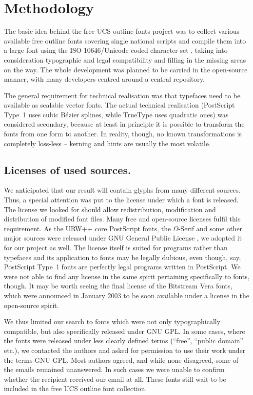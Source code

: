 \documentclass[english]{eurotex2003}
\begin{document}
\section{Methodology}

The basic idea behind the free UCS outline fonts project was to
collect various available free outline fonts covering single national
scripts and compile them into a large font using the ISO 10646/Unicode
coded character set \cite{Unicode3}, taking into consideration
typographic and legal compatibility and filling in the missing areas
on the way. The whole development was planned to be carried in the
open-source manner, with many developers centred around a central
repository.

The general requirement for technical realisation was that typefaces
need to be available as scalable vector fonts. The actual technical
realisation (Post\-Script Type~1 \cite{Adobe:Type1} uses cubic B\'ezier
splines, while TrueType \cite{Apple:TrueType} uses quadratic ones) was
considered secondary, because at least in principle it is possible
to transform the fonts from one form to another. In reality, though,
no known transformations is completely loss-less -- kerning and hints
are usually the most volatile.

\subsection{Licenses of used sources.} We anticipated that our result
will contain glyphs from many different sources. Thus, a special
attention was put to the license under which a font is released. The
license we looked for should allow redistribution, modification and
distribution of modified font files. Many free and open-source
licenses fulfil this requirement. As the URW++ core PostScript fonts,
the $\Omega$-Serif and some other major sources were released under
GNU General Public License \cite{GNU:GPL}, we adopted it for our
project as well. The license itself is suited for programs rather than
typefaces and its application to fonts may be legally dubious, even
though, say, PostScript Type~1 fonts are perfectly legal programs
written in PostScript. We were not able to find any license in the
same spirit pertaining specifically to fonts, though. It may be worth
seeing the final license of the Bitstream Vera fonts, which were
announced in January 2003 to be soon available under a license in the
open-source spirit.

We thus limited our search to fonts which were not only
typographically compatible, but also specifically released under GNU
GPL. In some cases, where the fonts were released under less clearly
defined terms (``free'', ``public domain'' etc.), we contacted the
authors and asked for permission to use their work under the terms GNU
GPL. Most authors agreed, and while none disagreed, some of the emails
remained unanswered. In such cases we were unable to confirm whether
the recipient received our email at all. These fonts still wait to be
included in the free UCS outline font collection.
\end{document}
